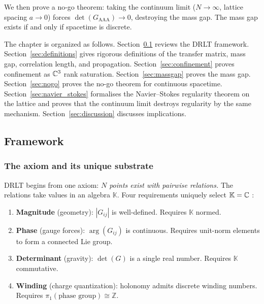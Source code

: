 We then prove a no-go theorem: taking the continuum limit
($N \to \infty$, lattice spacing $a \to 0$) forces
$\det(G_{\mathrm{AAA}}) \to 0$, destroying the mass gap. The mass gap
exists if and only if spacetime is discrete.

The chapter is organized as follows.
Section~\ref{sec:framework} reviews the DRLT framework.
Section~\ref{sec:definitions} gives rigorous definitions of the
transfer matrix, mass gap, correlation length, and propagation.
Section~\ref{sec:confinement} proves confinement as $\mathbb{C}^3$ rank
saturation.  Section~\ref{sec:massgap} proves the mass gap.
Section~\ref{sec:nogo} proves the no-go theorem for continuous
spacetime.  Section~\ref{sec:navier_stokes} formalises the
Navier--Stokes regularity theorem on the lattice and proves that
the continuum limit destroys regularity by the same mechanism.
Section~\ref{sec:discussion} discusses implications.

\subsection{Framework}
\label{sec:framework}

\subsubsection{The axiom and its unique substrate}

DRLT begins from one axiom: \emph{$N$ points exist with pairwise
relations.} The relations take values in an algebra $\mathbb{K}$.
Four requirements uniquely select $\mathbb{K} = \mathbb{C}$
\cite{Frobenius}:

\begin{enumerate}
\item[\textbf{R1.}] \textbf{Magnitude} (geometry): $|G_{ij}|$ is
  well-defined. Requires $\mathbb{K}$ normed.
\item[\textbf{R2.}] \textbf{Phase} (gauge forces): $\arg(G_{ij})$ is
  continuous. Requires unit-norm elements to form a connected Lie group.
\item[\textbf{R3.}] \textbf{Determinant} (gravity): $\det(G)$ is a
  single real number. Requires $\mathbb{K}$ commutative.
\item[\textbf{R4.}] \textbf{Winding} (charge quantization): holonomy
  admits discrete winding numbers. Requires
  $\pi_1(\text{phase group}) \cong \mathbb{Z}$.
\end{enumerate}

